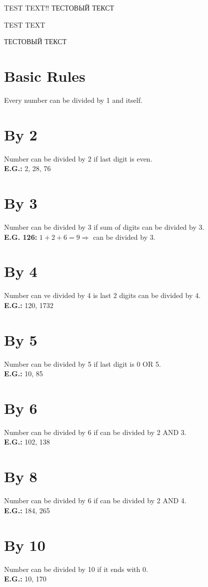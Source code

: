 \documentclass[a4paper]{article}
\begin{document}
TEST TEXT!!
ТЕСТОВЫЙ ТЕКСТ

\begin{Large}

TEST TEXT

ТЕСТОВЫЙ ТЕКСТ

\section*{Basic Rules}

Every number can be divided by 1 and itself.

\section*{By 2}

Number can be divided by 2 if last digit is even. \\[0.125cm]
\textbf{E.G.:} 2, 28, 76

\section*{By 3}

Number can be divided by 3 if sum of digits can be divided by 3. \\[0.125cm]
\textbf{E.G. 126:} $1 + 2 + 6 = 9 \Rightarrow$ can be divided by 3.

\section*{By 4}

Number can ve divided by 4 is last 2 digits can be divided by 4. \\[0.125cm]
\textbf{E.G.:} 120, 1732

\section*{By 5}

Number can be divided by 5 if last digit is 0 OR 5. \\[0.125cm]
\textbf{E.G.:} 10, 85

\section*{By 6}

Number can be divided by 6 if can be divided by 2 AND 3. \\[0.125cm]
\textbf{E.G.:} 102, 138

\section*{By 8}

Number can be divided by 6 if can be divided by 2 AND 4. \\[0.125cm]
\textbf{E.G.:} 184, 265

\section*{By 10}

Number can be divided by 10 if it ends with 0. \\[0.125cm]
\textbf{E.G.:} 10, 170

\end{Large}
\end{document}
